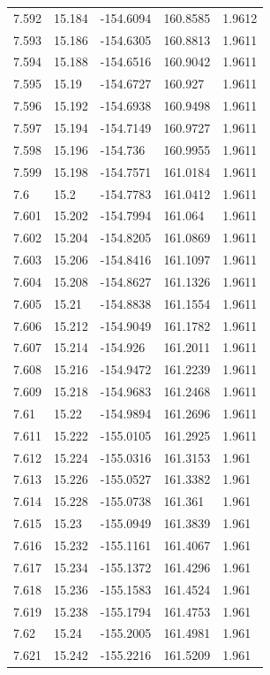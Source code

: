 \begin{tabular}{lllll}
7.592 & 15.184 & -154.6094 & 160.8585 & 1.9612 \\
7.593 & 15.186 & -154.6305 & 160.8813 & 1.9611 \\
7.594 & 15.188 & -154.6516 & 160.9042 & 1.9611 \\
7.595 & 15.19 & -154.6727 & 160.927 & 1.9611 \\
7.596 & 15.192 & -154.6938 & 160.9498 & 1.9611 \\
7.597 & 15.194 & -154.7149 & 160.9727 & 1.9611 \\
7.598 & 15.196 & -154.736 & 160.9955 & 1.9611 \\
7.599 & 15.198 & -154.7571 & 161.0184 & 1.9611 \\
7.6 & 15.2 & -154.7783 & 161.0412 & 1.9611 \\
7.601 & 15.202 & -154.7994 & 161.064 & 1.9611 \\
7.602 & 15.204 & -154.8205 & 161.0869 & 1.9611 \\
7.603 & 15.206 & -154.8416 & 161.1097 & 1.9611 \\
7.604 & 15.208 & -154.8627 & 161.1326 & 1.9611 \\
7.605 & 15.21 & -154.8838 & 161.1554 & 1.9611 \\
7.606 & 15.212 & -154.9049 & 161.1782 & 1.9611 \\
7.607 & 15.214 & -154.926 & 161.2011 & 1.9611 \\
7.608 & 15.216 & -154.9472 & 161.2239 & 1.9611 \\
7.609 & 15.218 & -154.9683 & 161.2468 & 1.9611 \\
7.61 & 15.22 & -154.9894 & 161.2696 & 1.9611 \\
7.611 & 15.222 & -155.0105 & 161.2925 & 1.9611 \\
7.612 & 15.224 & -155.0316 & 161.3153 & 1.961 \\
7.613 & 15.226 & -155.0527 & 161.3382 & 1.961 \\
7.614 & 15.228 & -155.0738 & 161.361 & 1.961 \\
7.615 & 15.23 & -155.0949 & 161.3839 & 1.961 \\
7.616 & 15.232 & -155.1161 & 161.4067 & 1.961 \\
7.617 & 15.234 & -155.1372 & 161.4296 & 1.961 \\
7.618 & 15.236 & -155.1583 & 161.4524 & 1.961 \\
7.619 & 15.238 & -155.1794 & 161.4753 & 1.961 \\
7.62 & 15.24 & -155.2005 & 161.4981 & 1.961 \\
7.621 & 15.242 & -155.2216 & 161.5209 & 1.961 \\

\end{tabular}
